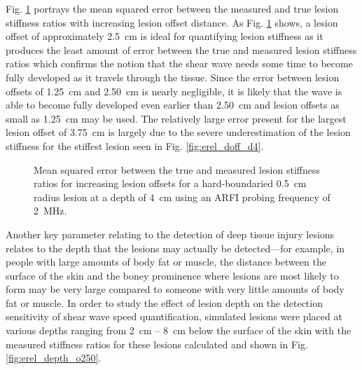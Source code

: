 			Fig. \ref{fig:erel_doff_mse_d4} portrays the mean squared error between the measured and true lesion stiffness ratios with increasing lesion offset distance. As Fig. \ref{fig:erel_doff_mse_d4} shows, a lesion offset of approximately \SI{2.5}{\cm} is ideal for quantifying lesion stiffness as it produces the least amount of error between the true and measured lesion stiffness ratios which confirms the notion that the shear wave needs some time to become fully developed as it travels through the tissue. Since the error between lesion offsets of \SI{1.25}{\cm} and \SI{2.50}{\cm} is nearly negligible, it is likely that the wave is able to become fully developed even earlier than \SI{2.50}{\cm} and lesion offsets as small as \SI{1.25}{\cm} may be used. The relatively large error present for the largest lesion offset of \SI{3.75}{\cm} is largely due to the severe underestimation of the lesion stiffness for the stiffest lesion seen in Fig. \ref{fig:erel_doff_d4}.

			\begin{figure}[!htb]
				\centering
				\caption[Shear-wave speed quantified mean squared error related to lesion offset]{Mean squared error between the true and measured lesion stiffness ratios for increasing lesion offsets for a hard-boundaried \SI{0.5}{cm} radius lesion at a depth of \SI{4}{\cm} using an ARFI probing frequency of \SI{2}{\MHz}.}
				\label{fig:erel_doff_mse_d4}
			\end{figure}

			Another key parameter relating to the detection of deep tissue injury lesions relates to the depth that the lesions may actually be detected---for example, in people with large amounts of body fat or muscle, the distance between the surface of the skin and the boney prominence where lesions are most likely to form may be very large compared to someone with very little amounts of body fat or muscle. In order to study the effect of lesion depth on the detection sensitivity of shear wave speed quantification, simulated lesions were placed at various depths ranging from \SI{2}{\cm} -- \SI{8}{\cm} below the surface of the skin with the measured stiffness ratios for these lesions calculated and shown in Fig. \ref{fig:erel_depth_o250}.

